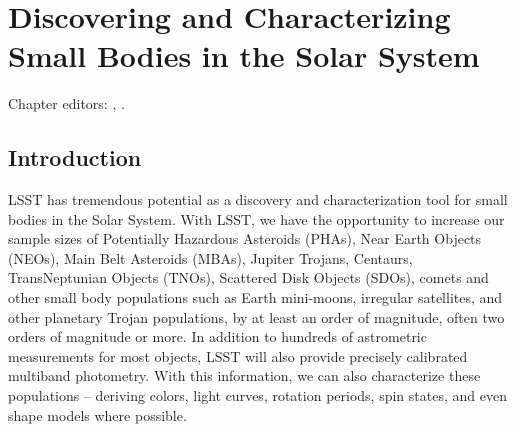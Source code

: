 \chapter[Solar System]{Discovering and Characterizing Small Bodies in
  the Solar System}
\def\chpname{solarsystem}\label{chp:\chpname}

Chapter editors:
,
.


\section{Introduction}
\label{sec:\chpname:intro}

LSST has tremendous potential as a discovery and characterization tool
for small bodies in the Solar System. With LSST, we have the
opportunity to increase our sample sizes of Potentially Hazardous
Asteroids (PHAs), Near Earth Objects (NEOs), Main Belt Asteroids
(MBAs), Jupiter Trojans, Centaurs, TransNeptunian Objects (TNOs),
Scattered Disk Objects (SDOs), comets and other small body populations
such as Earth mini-moons, irregular satellites, and other planetary
Trojan populations, by at least an order of
magnitude, often two orders of magnitude or more. In addition to
hundreds of astrometric measurements for most objects, LSST will also
provide precisely calibrated multiband photometry. With this
information, we can also characterize these populations -- deriving
colors, light curves, rotation periods, spin states, and even shape
models where possible.

